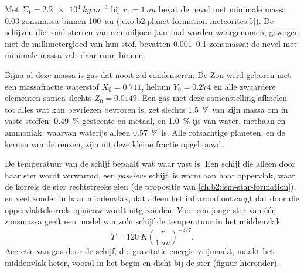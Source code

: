 Met $\Sigma_1 = \qty{2.2e4}{kg.m^{-2}}$ bij $r_1 = \qty{1}{au}$ bevat de nevel met minimale
massa $0.03$ zonsmassa binnen \qty{100}{au} (\cref{exo:b2:planet-formation-meteorites:5}). De schijven
die rond sterren van een miljoen jaar oud worden waargenomen, gewogen met de millimetergloed van
hun stof, bevatten \numrange{0.001}{0.1} zonsmassa: de nevel met minimale massa
valt daar ruim binnen.

Bijna al deze massa is gas dat nooit zal condenseren. De Zon werd geboren
met een massafractie waterstof $X_0 = 0.711$, helium $Y_0 = 0.274$ en
alle zwaardere elementen samen slechts $Z_0 = 0.0149$. Een gas met deze
samenstelling afkoelen tot alles wat kan bevriezen bevroren is, zet slechts
\qty{1.5}{\percent} van zijn massa om in vaste stoffen: \qty{0.49}{\percent} gesteente en
metaal, en \qty{1.0}{\percent} ijs van water, methaan en ammoniak, waarvan waterijs
alleen \qty{0.57}{\percent} is. Alle rotsachtige planeten, en de kernen van de
reuzen, zijn uit deze kleine fractie opgebouwd.

De temperatuur van de schijf bepaalt wat waar vast is. Een schijf die alleen door
haar ster wordt verwarmd, een \emph{passieve} schijf, is warm aan haar oppervlak, waar de korrels
de ster rechtstreeks zien (de propositie van \cref{ch:b2:ism-star-formation}), en
veel kouder in haar middenvlak, dat alleen het infrarood ontvangt dat door
die oppervlaktekorrels opnieuw wordt uitgezonden. Voor een jonge ster van één zonsmassa geeft een model van zo'n schijf
de temperatuur in het middenvlak
\[
  T = \qty{120}{K}\left(\frac{r}{\qty{1}{au}}\right)^{-3/7}.
\]
Accretie van gas door de schijf, die gravitatie-energie vrijmaakt, maakt
het middenvlak heter, vooral in het begin en dicht bij de ster (figuur hieronder).


